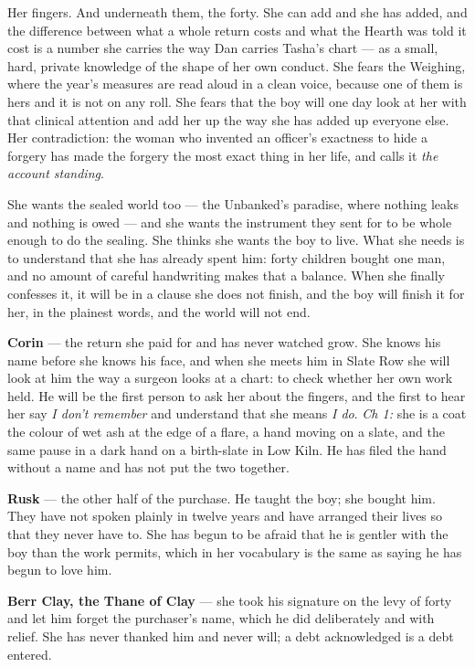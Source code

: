 \documentclass{design/chronicle}
\begin{document}
{
Her fingers. And underneath them, the forty. She can add and she has added, and the difference between what a whole return costs and what the Hearth was told it cost is a number she carries the way Dan carries Tasha’s chart — as a small, hard, private knowledge of the shape of her own conduct. She fears the Weighing, where the year’s measures are read aloud in a clean voice, because one of them is hers and it is not on any roll. She fears that the boy will one day look at her with that clinical attention and add her up the way she has added up everyone else. Her contradiction: the woman who invented an officer’s exactness to hide a forgery has made the forgery the most exact thing in her life, and calls it \emph{the account standing}.

She wants the sealed world too — the Unbanked’s paradise, where nothing leaks and nothing is owed — and she wants the instrument they sent for to be whole enough to do the sealing. She thinks she wants the boy to live. What she needs is to understand that she has already spent him: forty children bought one man, and no amount of careful handwriting makes that a balance. When she finally confesses it, it will be in a clause she does not finish, and the boy will finish it for her, in the plainest words, and the world will not end.

\textbf{Corin} — the return she paid for and has never watched grow. She knows his name before she knows his face, and when she meets him in Slate Row she will look at him the way a surgeon looks at a chart: to check whether her own work held. He will be the first person to ask her about the fingers, and the first to hear her say \emph{I don’t remember} and understand that she means \emph{I do}. \emph{Ch 1:} she is a coat the colour of wet ash at the edge of a flare, a hand moving on a slate, and the same pause in a dark hand on a birth-slate in Low Kiln. He has filed the hand without a name and has not put the two together.

\textbf{Rusk} — the other half of the purchase. He taught the boy; she bought him. They have not spoken plainly in twelve years and have arranged their lives so that they never have to. She has begun to be afraid that he is gentler with the boy than the work permits, which in her vocabulary is the same as saying he has begun to love him.

\textbf{Berr Clay, the Thane of Clay} — she took his signature on the levy of forty and let him forget the purchaser’s name, which he did deliberately and with relief. She has never thanked him and never will; a debt acknowledged is a debt entered.

}
\end{document}

